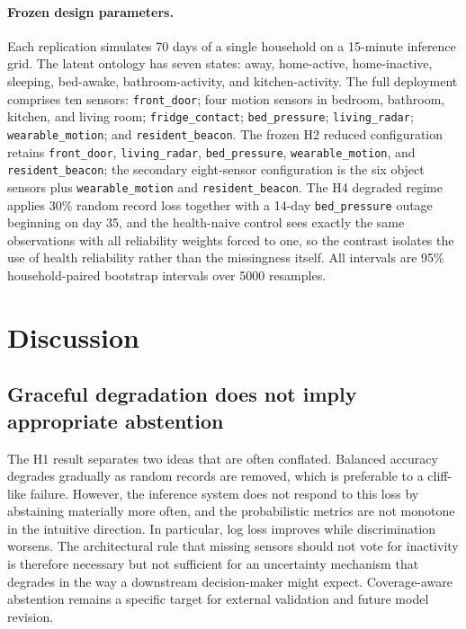 \documentclass[11pt]{article}
\begin{document}
\paragraph{Frozen design parameters.}
Each replication simulates 70 days of a single household on a 15-minute
inference grid. The latent ontology has seven states: away, home-active,
home-inactive, sleeping, bed-awake, bathroom-activity, and kitchen-activity. The
full deployment comprises ten sensors: \texttt{front\_door}; four motion sensors
in bedroom, bathroom, kitchen, and living room; \texttt{fridge\_contact};
\texttt{bed\_pressure}; \texttt{living\_radar}; \texttt{wearable\_motion}; and
\texttt{resident\_beacon}. The frozen H2 reduced configuration retains
\texttt{front\_door}, \texttt{living\_radar}, \texttt{bed\_pressure},
\texttt{wearable\_motion}, and \texttt{resident\_beacon}; the secondary
eight-sensor configuration is the six object sensors plus
\texttt{wearable\_motion} and \texttt{resident\_beacon}. The H4 degraded regime
applies 30\% random record loss together with a 14-day \texttt{bed\_pressure}
outage beginning on day 35, and the health-naive control sees exactly the same
observations with all reliability weights forced to one, so the contrast
isolates the use of health reliability rather than the missingness itself. All
intervals are 95\% household-paired bootstrap intervals over 5000 resamples.



\section{Discussion}

\subsection{Graceful degradation does not imply appropriate abstention}
\label{sec:h1abstention}

The H1 result separates two ideas that are often conflated. Balanced accuracy degrades gradually as random records are removed, which is preferable to a cliff-like failure. However, the inference system does not respond to this loss by abstaining materially more often, and the probabilistic metrics are not monotone in the intuitive direction. In particular, log loss improves while discrimination worsens. The architectural rule that missing sensors should not vote for inactivity is therefore necessary but not sufficient for an uncertainty mechanism that degrades in the way a downstream decision-maker might expect. Coverage-aware abstention remains a specific target for external validation and future model revision.
\end{document}
